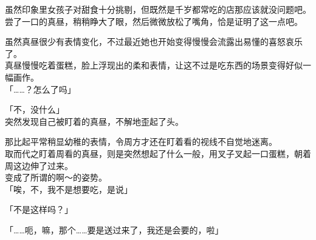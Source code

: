 虽然印象里女孩子对甜食十分挑剔，但既然是千岁都常吃的店那应该就没问题吧。\\

尝了一口的真昼，稍稍睁大了眼，然后微微放松了嘴角，恰是证明了这一点吧。

虽然真昼很少有表情变化，不过最近她也开始变得慢慢会流露出易懂的喜怒哀乐了。\\

真昼慢慢吃着蛋糕，脸上浮现出的柔和表情，让这不过是吃东西的场景变得好似一幅画作。\\

「……？怎么了吗」

「不，没什么」\\

突然发现自己被盯着的真昼，不解地歪起了头。

那比起平常稍显幼稚的表情，令周方才还在盯着看的视线不自觉地迷离。\\

取而代之盯着周看的真昼，则是突然想起了什么一般，用叉子叉起一口蛋糕，朝着周这边伸了过来。\\

变成了所谓的啊～的姿势。\\

「唉，不，我不是想要吃，是说」

「不是这样吗？」

「……呃，嘛，那个……要是送过来了，我还是会要的，啦」\\

